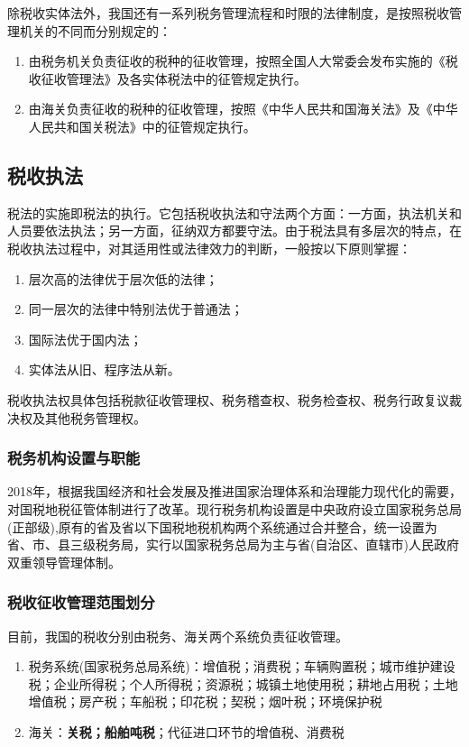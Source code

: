 \documentclass[UTF8,12pt]{ctexart}
\numberwithin{equation}{section} %
\numberwithin{figure}{section}
\numberwithin{table}{section}
\begin{document}
	除税收实体法外，我国还有一系列税务管理流程和时限的法律制度，是按照税收管理机关的不同而分别规定的：
	\begin{enumerate}
		\item 由税务机关负责征收的税种的征收管理，按照全国人大常委会发布实施的《税收征收管理法》及各实体税法中的征管规定执行。
		
		\item 由海关负责征收的税种的征收管理，按照《中华人民共和国海关法》及《中华人民共和国关税法》中的征管规定执行。
	\end{enumerate}
	
	
	\subsection{税收执法}
	税法的实施即税法的执行。它包括税收执法和守法两个方面：一方面，执法机关和人员要依法执法；另一方面，征纳双方都要守法。由于税法具有多层次的特点，在税收执法过程中，对其适用性或法律效力的判断，一般按以下原则掌握：
	\begin{enumerate}
		\item 层次高的法律优于层次低的法律；
		
		\item 同一层次的法律中特别法优于普通法；
		
		\item 国际法优于国内法；
		
		\item 实体法从旧、程序法从新。
	\end{enumerate}
	税收执法权具体包括税款征收管理权、税务稽查权、税务检查权、税务行政复议裁决权及其他税务管理权。
	
	\subsubsection{税务机构设置与职能}
	2018年，根据我国经济和社会发展及推进国家治理体系和治理能力现代化的需要，对国税地税征管体制进行了改革。现行税务机构设置是中央政府设立国家税务总局(正部级),原有的省及省以下国税地税机构两个系统通过合并整合，统一设置为省、市、县三级税务局，实行以国家税务总局为主与省(自治区、直辖市)人民政府双重领导管理体制。
	
	\subsubsection{税收征收管理范围划分}
	目前，我国的税收分别由税务、海关两个系统负责征收管理。
	\begin{enumerate}
		\item 税务系统(国家税务总局系统)：增值税；消费税；车辆购置税；城市维护建设税；企业所得税；个人所得税；资源税；城镇土地使用税；耕地占用税；土地增值税；房产税；车船税；印花税；契税；烟叶税；环境保护税
		
		\item 海关：\textbf{关税；船舶吨税}；代征进口环节的增值税、消费税
	\end{enumerate}
	
\end{document}
